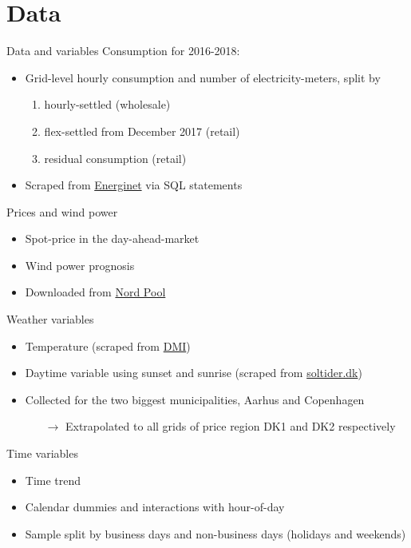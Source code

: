 \section{Data}

\begin{frame}{Data and variables}
Consumption for 2016-2018:
\begin{itemize}
    \item Grid-level hourly consumption and number of electricity-meters, split by
    \begin{enumerate}
        \normalsize
        \item hourly-settled (wholesale)
        \item flex-settled from December 2017 (retail)
        \item residual consumption (retail)
    \end{enumerate}
    \item Scraped from \href{https://www.energidataservice.dk/en/}{Energinet} via SQL statements
\end{itemize}
Prices and wind power
\begin{itemize}
    \item Spot-price in the day-ahead-market
    \item Wind power prognosis
    \item Downloaded from \href{https://www.nordpoolgroup.com/historical-market-data/}{Nord Pool}
\end{itemize}
Weather variables
\begin{itemize}
    \item Temperature (scraped from \href{https://www.dmi.dk/vejrarkiv/}{DMI})
    \item Daytime variable using sunset and sunrise (scraped from \href{https://soltider.dk/}{soltider.dk})
    \item Collected for the two biggest municipalities, Aarhus and Copenhagen
    \begin{itemize}
        \normalsize
        \item[$\rightarrow$] Extrapolated to all grids of price region DK1 and DK2 respectively
    \end{itemize}
\end{itemize}
Time variables
\begin{itemize}
    \item Time trend
    \item Calendar dummies and interactions with hour-of-day
    \item Sample split by business days and non-business days (holidays and weekends)
\end{itemize}
\end{frame}

